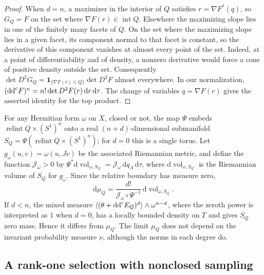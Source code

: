 \begin{proof}
When $d=n$, a maximizer in the interior of $Q$ satisfies $r=\nabla F^*(q)$, so
$G_Q=F$ on the set where $\nabla F(r)\in\operatorname{int}Q$.
Elsewhere the maximizing slope lies in one of the finitely many facets of $Q$. On the set where the maximizing slope lies in a given facet, its component normal to that facet is constant, so the derivative of this component vanishes at almost every point of the set. Indeed, at a point of differentiability and of density, a nonzero derivative would force a cone of positive density outside the set. Consequently
$\det D^2G_Q=\boldsymbol1_{\{\nabla F(r)\in Q\}}\det D^2F$
almost everywhere. In our normalization,
$(\mathrm{dd}^{\mathrm{c}} F)^n=n!\det D^2F(r)\,\mathrm dr\,\mathrm d\tau$.
The change of variables $q=\nabla F(r)$ gives the asserted identity for the top product.
\end{proof}

For any Hermitian form $\omega$ on $X$, closed or not, the map $\Psi$
embeds $\operatorname{relint}Q\times(S^1)^n$ onto a real
$(n+d)$-dimensional submanifold $S_Q=\Psi(\operatorname{relint}Q\times(S^1)^n)$; for $d=0$ this is a single torus.
Let $g_\omega(u,v)=\omega(u,Jv)$ be the associated Riemannian metric, and define the function $\mathcal J_\omega>0$ by
$\Psi^*\mathrm d\operatorname{vol}_{\omega,S_Q}
=\mathcal J_\omega\,\mathrm dq_\Lambda\,\mathrm d\tau$, where $\mathrm d\operatorname{vol}_{\omega,S_Q}$ is the Riemannian volume of $S_Q$ for $g_\omega$.
Since the relative boundary has measure zero,
\[
 \mathrm d\mu_Q=\frac{d!}{\mathcal J_\omega\circ\Psi^{-1}}
                    \,\mathrm d\operatorname{vol}_{\omega,S_Q}.
\]
If $d<n$, the mixed measure
$\langle(\theta+\mathrm{dd}^{\mathrm{c}} E_Q)^d\rangle\wedge\omega^{n-d}$, where the zeroth power is interpreted as $1$ when $d=0$, has a locally
bounded density on $T$ and gives $S_Q$ zero mass. Hence it differs from
$\mu_Q$.
The limit $\mu_Q$ does not depend on the invariant probability measure $\nu$, although the norms in each degree do.

\subsection{A rank-one selection with nonclosed sampling}

